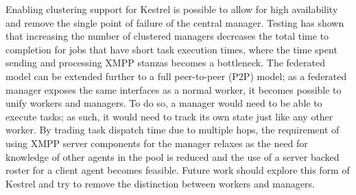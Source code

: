 Enabling clustering support for Kestrel is possible to allow for high
availability and remove the single point of failure of the central manager.
Testing has shown that increasing the number of clustered managers decreases the
total time to completion for jobs that have short task execution times, where
the time spent sending and processing XMPP stanzas becomes a bottleneck. The
federated model can be extended further to a full peer-to-peer (P2P) model; as
a federated manager exposes the same interfaces as a normal worker, it becomes
possible to unify workers and managers. To do so, a manager would need to be
able to execute tasks; as such, it would need to track its own state just like
any other worker. By trading task dispatch time due to multiple hops, the
requirement of using XMPP server components for the manager relaxes as the need
for knowledge of other agents in the pool is reduced and the use of a server
backed roster for a client agent becomes feasible. Future work should explore
this form of Kestrel and try to remove the distinction between workers and managers.
